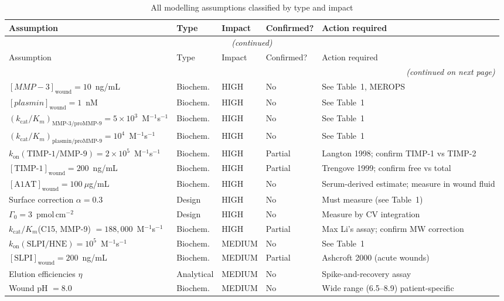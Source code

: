 \documentclass[10pt,a4paper]{article}
\begin{document}
{\footnotesize
\begin{longtable}{p{5.1cm}p{2.0cm}p{1.6cm}p{1.7cm}p{4.1cm}}
\caption{All modelling assumptions classified by type and impact}\\
\toprule
Assumption & Type & Impact & Confirmed? & Action required \\
\midrule
\endfirsthead
\multicolumn{5}{c}{\textit{(continued)}}\\
\toprule
Assumption & Type & Impact & Confirmed? & Action required \\
\midrule
\endhead
\midrule
\multicolumn{5}{r}{\textit{(continued on next page)}}\\
\endfoot
\bottomrule
\endlastfoot
$[MMP-3]_\text{wound} = 10$~ng/mL & Biochem. & HIGH & No & See Table~1, MEROPS \\
$[plasmin]_\text{wound} = 1$~nM & Biochem. & HIGH & No & See Table~1 \\
$(k_\text{cat}/K_m)_\text{MMP-3/proMMP-9} = 5\times10^3$~M$^{-1}$s$^{-1}$ & Biochem. & HIGH & No & See Table~1 \\
$(k_\text{cat}/K_m)_\text{plasmin/proMMP-9} = 10^4$~M$^{-1}$s$^{-1}$ & Biochem. & HIGH & No & See Table~1 \\
$k_\text{on}(\text{TIMP-1/MMP-9}) = 2\times10^5$~M$^{-1}$s$^{-1}$ & Biochem. & HIGH & Partial & Langton 1998; confirm TIMP-1 vs TIMP-2 \\
$[\text{TIMP-1}]_\text{wound} = 200$~ng/mL & Biochem. & HIGH & Partial & Trengove 1999; confirm free vs total \\
$[\text{A1AT}]_\text{wound} = 100~\mu$g/mL & Biochem. & HIGH & No & Serum-derived estimate; measure in wound fluid \\
Surface correction $\alpha = 0.3$ & Design & HIGH & No & Must measure (see Table~1) \\
$\Gamma_0 = 3$~pmol\,cm$^{-2}$ & Design & HIGH & No & Measure by CV integration \\
$k_\text{cat}/K_m$(C15, MMP-9) $= 188{,}000$~M$^{-1}$s$^{-1}$ & Biochem. & HIGH & Partial & Max Li's assay; confirm MW correction \\
$k_\text{on}(\text{SLPI/HNE}) = 10^5$~M$^{-1}$s$^{-1}$ & Biochem. & MEDIUM & No & See Table~1 \\
$[\text{SLPI}]_\text{wound} = 200$~ng/mL & Biochem. & MEDIUM & Partial & Ashcroft 2000 (acute wounds) \\
Elution efficiencies $\eta$ & Analytical & MEDIUM & No & Spike-and-recovery assay \\
Wound pH $= 8.0$ & Biochem. & MEDIUM & No & Wide range (6.5--8.9) patient-specific \\

\end{longtable}}
\end{document}
